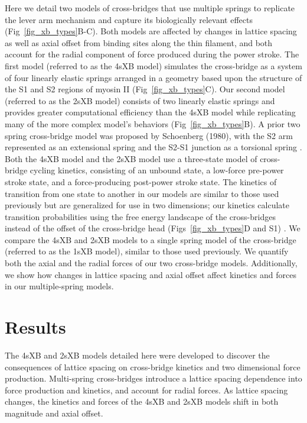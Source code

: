 \documentclass[10pt]{article}
\newcommand{\citep}[1]{\cite{#1}} %
\begin{document}
Here we detail two models of cross-bridges that use multiple springs to replicate the lever arm mechanism and capture its biologically relevant effects (Fig~\ref{fig_xb_types}B-C).  
Both models are affected by changes in lattice spacing as well as axial offset from binding sites along the thin filament, and both account for the radial component of force produced during the power stroke.  
The first model (referred to as the 4sXB model) simulates the cross-bridge as a system of four linearly elastic springs arranged in a geometry based upon the structure of the S1 and S2 regions of myosin II (Fig~\ref{fig_xb_types}C).  
Our second model (referred to as the 2sXB model) consists of two linearly elastic springs and provides greater computational efficiency than the 4sXB model while replicating many of the more complex model's behaviors (Fig~\ref{fig_xb_types}B). 
A prior two spring cross-bridge model was proposed by Schoenberg (1980), with the S2 arm represented as an extensional spring and the S2-S1 junction as a torsional spring \citep{Schoenberg1980a, Schoenberg1980b}. 
Both the 4sXB model and the 2sXB model use a three-state model of cross-bridge cycling kinetics, consisting of an unbound state, a low-force pre-power stroke state, and a force-producing post-power stroke state. 
The kinetics of transition from one state to another in our models are similar to those used previously but are generalized for use in two dimensions; our kinetics calculate transition probabilities using the free energy landscape of the cross-bridges instead of the offset of the cross-bridge head (Figs~\ref{fig_xb_types}D and S1) \citep{Pate1989, Daniel1998, Takagi2004, Tanner2007}. 
We compare the 4sXB and 2sXB models to a single spring model of the cross-bridge (referred to as the 1sXB model), similar to those used previously. 
We quantify both the axial and the radial forces of our two cross-bridge models. 
Additionally, we show how changes in lattice spacing and axial offset affect kinetics and forces in our multiple-spring models. 


\section*{Results} %

The 4sXB and 2sXB models detailed here were developed to discover the consequences of lattice spacing on cross-bridge kinetics and two dimensional force production.
Multi-spring cross-bridges introduce a lattice spacing dependence into force production and kinetics, and account for radial forces. 
As lattice spacing changes, the kinetics and forces of the 4sXB and 2sXB models shift in both magnitude and axial offset.
\end{document}
